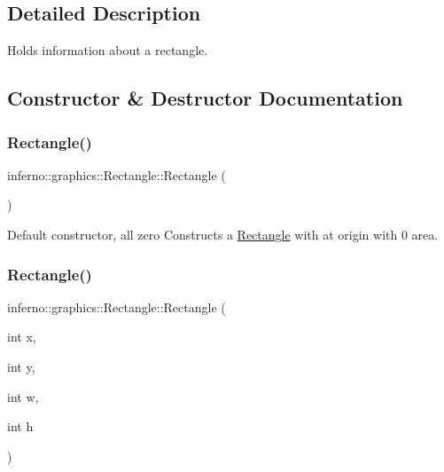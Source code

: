 \subsection{Detailed Description}
Holds information about a rectangle. 



\subsection{Constructor \& Destructor Documentation}
\mbox{\label{classinferno_1_1graphics_1_1_rectangle_ab60df3580f0cc0fd5a24bd8ec5783933}} 
\subsubsection{\texorpdfstring{Rectangle()}{Rectangle()}\hspace{0.1cm}{\footnotesize\ttfamily [1/3]}}
{\footnotesize\ttfamily inferno\+::graphics\+::\+Rectangle\+::\+Rectangle (\begin{DoxyParamCaption}{ }\end{DoxyParamCaption})\hspace{0.3cm}{\ttfamily [inline]}}



Default constructor, all zero Constructs a \mbox{\hyperlink{classinferno_1_1graphics_1_1_rectangle}{Rectangle}} with at origin with 0 area. 

\mbox{\label{classinferno_1_1graphics_1_1_rectangle_a6abc478421b60e8549d44a2640aba2e8}} 
\subsubsection{\texorpdfstring{Rectangle()}{Rectangle()}\hspace{0.1cm}{\footnotesize\ttfamily [2/3]}}
{\footnotesize\ttfamily inferno\+::graphics\+::\+Rectangle\+::\+Rectangle (\begin{DoxyParamCaption}\item[{int}]{x,  }\item[{int}]{y,  }\item[{int}]{w,  }\item[{int}]{h }\end{DoxyParamCaption})\hspace{0.3cm}{\ttfamily [inline]}}



